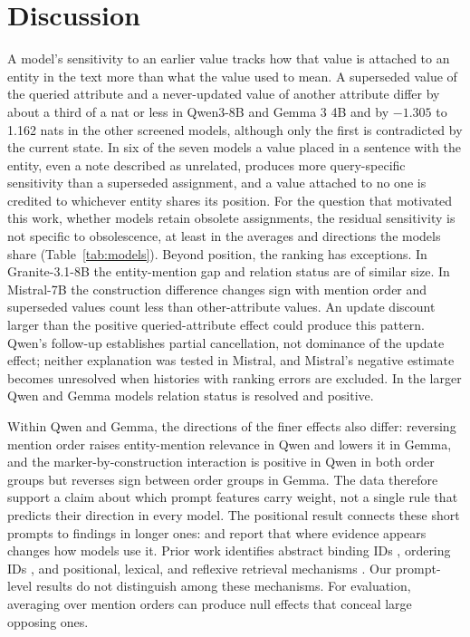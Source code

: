 \section{Discussion}
\label{sec:discussion}

A model's sensitivity to an earlier value tracks how that value is attached to an entity in the text more than what the value used to mean. A superseded value of the queried attribute and a never-updated value of another attribute differ by about a third of a nat or less in Qwen3-8B and Gemma 3 4B and by $-1.305$ to 1.162 nats in the other screened models, although only the first is contradicted by the current state. In six of the seven models a value placed in a sentence with the entity, even a note described as unrelated, produces more query-specific sensitivity than a superseded assignment, and a value attached to no one is credited to whichever entity shares its position. For the question that motivated this work, whether models retain obsolete assignments, the residual sensitivity is not specific to obsolescence, at least in the averages and directions the models share (Table~\ref{tab:models}). Beyond position, the ranking has exceptions. In Granite-3.1-8B the entity-mention gap and relation status are of similar size. In Mistral-7B the construction difference changes sign with mention order and superseded values count less than other-attribute values. An update discount larger than the positive queried-attribute effect could produce this pattern. Qwen's follow-up establishes partial cancellation, not dominance of the update effect; neither explanation was tested in Mistral, and Mistral's negative estimate becomes unresolved when histories with ranking errors are excluded. In the larger Qwen and Gemma models relation status is resolved and positive.

Within Qwen and Gemma, the directions of the finer effects also differ: reversing mention order raises entity-mention relevance in Qwen and lowers it in Gemma, and the marker-by-construction interaction is positive in Qwen in both order groups but reverses sign between order groups in Gemma. The data therefore support a claim about which prompt features carry weight, not a single rule that predicts their direction in every model. The positional result connects these short prompts to findings in longer ones: \citet{liu2024lost} and \citet{yang2026conflicts} report that where evidence appears changes how models use it. Prior work identifies abstract binding IDs \citep{feng2024bind}, ordering IDs \citep{prakash2026lookbacks}, and positional, lexical, and reflexive retrieval mechanisms \citep{gurarieh2026mixing}. Our prompt-level results do not distinguish among these mechanisms. For evaluation, averaging over mention orders can produce null effects that conceal large opposing ones.

